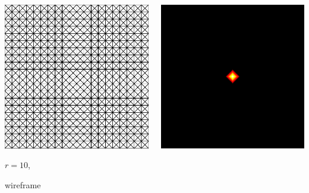 \documentclass[aspectratio=169,t]{beamer}
\begin{document}
{\begin{columns}
\begin{column}{0.22\textwidth}
			\includegraphics[width=.85\textwidth]{data/synthetic_meshes/square_tesselation_4tri_Dirac_delta_10_v841_f1600_wireframe_2.png}
			{\footnotesize
				\par \vspace{-1mm} $r=10$,
				\par \vspace{-1mm} wireframe
			}
		\end{column}
		\begin{column}{0.22\textwidth}
			\centering
			\includegraphics[width=.85\textwidth]{data/synthetic_meshes/square_tesselation_4tri_Dirac_delta_10_v841_f1600_funcvals_0iter.png}

\end{column}
\end{columns}}
\end{document}
